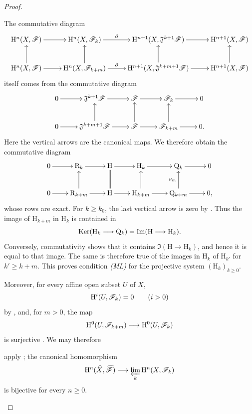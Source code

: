 \begin{proof}
\begin{env}[4.1.7.21]
\label{III.4.1.7.21}
The commutative diagram
\[
  \xymatrix@C=2.5em{
    \HH^n(X,\sh{F})
      \ar[r]
    &
    \HH^n(X,\sh{F}_k)
      \ar[r]^-{\partial}
    &
    \HH^{n+1}(X,\mathfrak{J}^{k+1}\sh{F})
      \ar[r]
    &
    \HH^{n+1}(X,\sh{F})
    \\
    \HH^n(X,\sh{F})
      \ar[r]\ar[u]
    &
    \HH^n(X,\sh{F}_{k+m})
      \ar[r]^-{\partial}\ar[u]
    &
    \HH^{n+1}(X,\mathfrak{J}^{k+m+1}\sh{F})
      \ar[r]\ar[u]
    &
    \HH^{n+1}(X,\sh{F})
      \ar[u]
  }
\]
itself comes from the commutative diagram
\[
  \xymatrix{
    0\ar[r]
    &
    \mathfrak{J}^{k+1}\sh{F}\ar[r]
    &
    \sh{F}\ar[r]
    &
    \sh{F}_k\ar[r]
    &
    0
    \\
    0\ar[r]
    &
    \mathfrak{J}^{k+m+1}\sh{F}\ar[r]\ar[u]
    &
    \sh{F}\ar[r]\ar[u]
    &
    \sh{F}_{k+m}\ar[r]\ar[u]
    &
    0.
  }
\]
Here the vertical arrows are the canonical maps.
We therefore obtain the commutative diagram
\[
  \xymatrix@C=2.2em{
    0\ar[r]
    &
    \mathrm{R}_k\ar[r]
    &
    \mathrm{H}\ar[r]
    &
    \mathrm{H}_k\ar[r]
    &
    \mathrm{Q}_k\ar[r]
    &
    0
    \\
    0\ar[r]
    &
    \mathrm{R}_{k+m}\ar[r]\ar[u]
    &
    \mathrm{H}\ar[r]\ar@{=}[u]
    &
    \mathrm{H}_{k+m}\ar[r]\ar[u]
    &
    \mathrm{Q}_{k+m}\ar[r]\ar[u]^{\nu_m}
    &
    0,
  }
\]
whose rows are exact.
For $k\geq k_0$, the last vertical arrow is zero by
.
Thus the image of $\mathrm{H}_{k+m}$ in $\mathrm{H}_k$ is contained
in
\[
  \operatorname{Ker}(\mathrm{H}_k\longrightarrow\mathrm{Q}_k)
  =
  \operatorname{Im}(\mathrm{H}\longrightarrow\mathrm{H}_k).
\]
Conversely, commutativity shows that it contains
$\Im(\mathrm{H}\to\mathrm{H}_k)$, and hence it is equal to that
image.
The same is therefore true of the images in $\mathrm{H}_k$ of
$\mathrm{H}_{k'}$ for $k'\geq k+m$.
This proves condition \emph{(ML)} for the projective system
$(\mathrm{H}_k)_{k\geq0}$.

Moreover, for every affine open subset $U$ of $X$,
\[
  \mathrm{H}^i(U,\mathscr{F}_k)=0
  \qquad(i>0)
\]
by , and, for $m>0$, the map
\[
  \mathrm{H}^0(U,\mathscr{F}_{k+m})
  \longrightarrow
  \mathrm{H}^0(U,\mathscr{F}_k)
\]
is surjective .
We may therefore


apply ; the canonical homomorphism
\[
  \mathrm{H}^n(\widehat{X},\widehat{\mathscr{F}})
  \longrightarrow
  \varprojlim_k\mathrm{H}^n(X,\mathscr{F}_k)
\]
is bijective for every $n\geq0$.


\end{env}
\end{proof}

